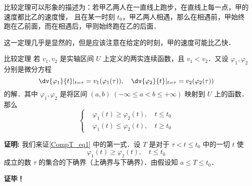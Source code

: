 比较定理可以形象的描述为：若甲乙两人在一直线上跑步，在直线上每一点，甲的速度都比乙的速度慢， 且在某一时刻 $t_0$，甲乙两人相遇，那么在相遇前，甲始终跑在乙前面，而在相遇后，甲则始终跑在乙的后面．

这一定理几乎是显然的，但是应该注意在给定的时刻，甲的速度可能比乙快．
\begin{theorem}{比较定理}
若 $v_1,v_2$ 是实轴区间 $U$ 上定义的两实连续函数，且 $v_1<v_2$．又设 $\varphi_1,\varphi_2$ 分别是微分方程
\begin{equation}
\dv{\varphi_1}{t}|_{t=\tau}=v_1(\varphi_1(\tau)), \quad \dv{\varphi_2}{t}|_{t=\tau}=v_2(\varphi_2(\tau))
\end{equation}
的解．其中 $\varphi_1,\varphi_2$ 是将区间 $(a,b)\;(-\infty\leq a<b\leq+\infty)$ 映射到 $U$ 上的函数．那么
\begin{equation}\label{CompT_eq1}
\left\{\begin{aligned}
    &\varphi_1(t)\geq\varphi_2(t),\quad t\leq t_0\\
    &\varphi_1(t)\leq\varphi_2(t),\quad t\geq t_0
\end{aligned}\right.
\end{equation}

\end{theorem} 
\textbf{证明:}
我们来证\autoref{CompT_eq1} 中的第一式．设 $T$ 是对于 $\tau<t\leq t_0$ 中的一切 $t$ 使
\begin{equation}
\varphi_1(t)\geq\varphi_2(t),\quad t\leq t_0
\end{equation}
成立的数 $\tau$ 的集合的下确界（上确界与下确界）．由假设知 $a\leq T\leq t_0$．

\textbf{证毕！}
